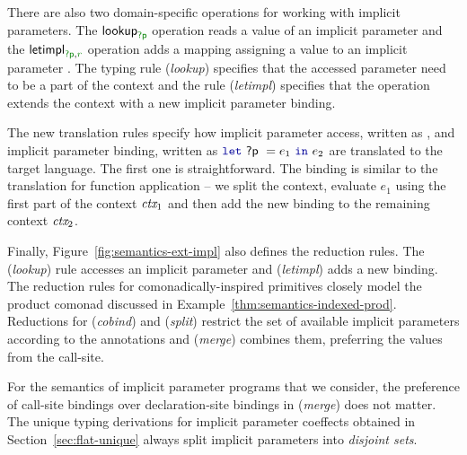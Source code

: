 There are also two domain-specific operations for working with implicit parameters. The
$\ident{lookup}_{\cclrd{\ident{?p}}}$ operation reads a value of an implicit parameter and
the $\ident{letimpl}_{\cclrd{\ident{?p}}, \cclrd{r}}$ operation adds a mapping assigning a value
to an implicit parameter . The typing rule (\emph{lookup}) specifies that the accessed
parameter need to be a part of the context and the rule (\emph{letimpl}) specifies that the
 operation extends the context with a new implicit parameter binding.

The new translation rules specify how implicit parameter access, written as , and
implicit parameter binding, written as $\kvd{let}~\ident{?p}~=e_1~\kvd{in}~e_2$ are translated to the
target language. The first one is straightforward. The binding is similar to the translation for
function application -- we split the context, evaluate $e_1$ using the first part of the context
$\textit{ctx}_1$ and then add the new binding to the remaining context $\textit{ctx}_2$.

Finally, Figure~\ref{fig:semantics-ext-impl} also defines the reduction rules. The (\emph{lookup})
rule accesses an implicit parameter and (\emph{letimpl}) adds a new binding. The reduction rules 
for comonadically-inspired primitives closely model the product comonad discussed in 
Example~\ref{thm:semantics-indexed-prod}. Reductions for (\emph{cobind}) and (\emph{split}) 
restrict the set of available implicit parameters according to the annotations and 
(\emph{merge}) combines them, preferring the values from the call-site.

For the semantics of implicit parameter programs that we consider, the preference of call-site
bindings over declaration-site bindings in (\emph{merge}) does not matter. The unique typing 
derivations for implicit parameter coeffects obtained in Section~\ref{sec:flat-unique} always
split implicit parameters into \emph{disjoint sets}.


